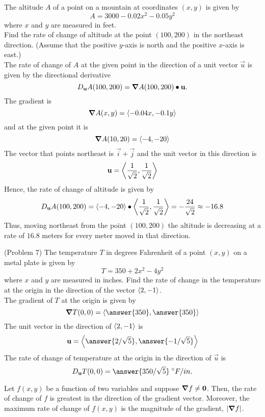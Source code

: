 \documentclass[handout]{ximera}
\begin{document}
\begin{example}[Example 7]
The altitude $A$ of a point on a mountain at coordinates $(x, y)$ is given by
\[
A = 3000 - 0.02x^2 - 0.05y^2
\]
where $x$ and $y$ are measured in feet.\\
Find the rate of change of altitude at the point $(100, 200)$ in the northeast direction. 
(Assume that the positive $y$-axis is north and the positive $x$-axis is east.)\\
The rate of change of $A$ at the given point in the direction of a unit vector $\vec u$ is given by the directional derivative
\[
D_{\mathbf u} A(100, 200) = \boldsymbol\nabla A(100,200) \bullet \mathbf u.
\]
The gradient is
\[
\boldsymbol\nabla A(x,y) = \left\langle -0.04x, -0.1y\right\rangle
\]
and at the given point it is
\[
\boldsymbol\nabla A(10,20) = \left\langle -4, -20\right\rangle
\]
The vector that points northeast is $\vec i  + \vec j$ and the unit vector in this direction is
\[
\mathbf u = \left\langle \frac{1}{\sqrt 2}, \frac{1}{\sqrt 2}\right\rangle
\]
Hence, the rate of change of altitude is given by
\[
D_{\mathbf u} A(100, 200) = \left\langle -4, -20\right\rangle \bullet \left\langle \frac{1}{\sqrt 2}, \frac{1}{\sqrt 2}\right\rangle = -\frac{24}{\sqrt 2} \approx -16.8
\]
Thus, moving northeast from the point $(100, 200)$ the altitude is decreasing at a rate of 
$16.8$ meters for every meter moved in that direction.
\end{example}

\begin{problem}(Problem 7)
The temperature $T$ in degrees Fahrenheit of a point $(x,y)$ on a metal plate is given by 
\[
T = 350 + 2x^2 - 4y^2
\]
where $x$ and $y$ are measured in inches.  Find the rate of change in the temperature at the origin in the direction of the vector $\left\langle 2,-1\right\rangle$.\\
The gradient of $T$ at the origin is given by
\[
\grad T(0,0) = \vector{\answer{350}, \answer{350}}
\]
The unit vector in the direction of $\left\langle 2, -1\right\rangle$ is
\[
\vec u = \vector{\answer{2/\sqrt 5}, \answer{-1/\sqrt 5}}
\]
The rate of change of temperature at the origin in the direction of $\vec u$ is
\[
D_{\vec u} T(0,0) = \answer{350/ \sqrt 5} \; ^\circ F / in.
\]
\end{problem}



\begin{proposition}
Let $f(x,y)$ be a function of two variables and suppose $\boldsymbol\nabla f \neq \mathbf 0$. 
Then, the rate of change of $f$ is greatest in the direction of the gradient vector.
Moreover, the maximum rate of change of $f(x,y)$ is the magnitude of the gradient, $|\boldsymbol\nabla f|$.

\end{proposition}
\end{document}
